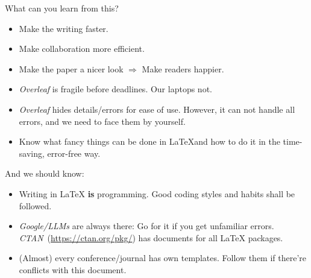 What can you learn from this?

\begin{itemize}
  \item Make the writing faster.
  \item Make collaboration more efficient.
  \item Make the paper a nicer look $\Rightarrow$ Make readers happier.
  \item \textit{Overleaf} is fragile before deadlines. Our laptops not.
  \item \textit{Overleaf} hides details/errors for ease of use. However, it can not handle all errors, and we need to face them by yourself.
  \item Know what fancy things can be done in \LaTeX and how to do it in the time-saving, error-free way.
\end{itemize}

And we should know:
\begin{itemize}
  \item Writing in {\LaTeX} \textbf{is} programming. Good coding styles and habits shall be followed.
  \item 
    \textit{Google/LLMs} are always there: Go for it if you get unfamiliar errors.
    \textit{CTAN}~(\url{https://ctan.org/pkg/}) has documents for all {\LaTeX} packages.
  \item (Almost) every conference/journal has own templates. Follow them if there're conflicts with this document.
\end{itemize}
